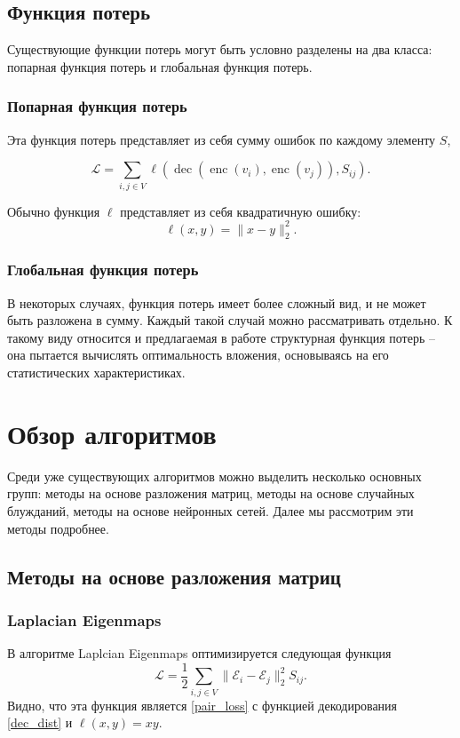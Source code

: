 \documentclass[12pt,a4paper]{extarticle}
\newcommand{\E}{\mathcal{E}}
\newcommand{\Loss}{\mathcal{L}}
\newcommand{\encoder}{\operatorname{enc}}
\newcommand{\decoder}{\operatorname{dec}}
\begin{document}
    \subsection{Функция потерь}
    Существующие функции потерь могут быть условно разделены на два класса: попарная функция потерь и глобальная функция потерь.
    
    \subsubsection{Попарная функция потерь}
    Эта функция потерь представляет из себя сумму ошибок по каждому элементу $S$,
    
    \begin{equation} \label{pair_loss}
        \Loss = \sum_{i, j \in V} \ell (\decoder(\encoder(v_i), \encoder(v_j)), S_{ij}).
    \end{equation}
    
    Обычно функция $\ell$ представляет из себя квадратичную ошибку:
    \begin{equation} \label{pair_loss_dist}
    \ell(x, y) = \lVert x - y \rVert_2^2.
    \end{equation}
    
    \subsubsection{Глобальная функция потерь}
    В некоторых случаях, функция потерь имеет более сложный вид, и не может быть разложена в сумму. Каждый такой случай можно рассматривать отдельно. К такому виду относится и предлагаемая в работе структурная функция потерь -- она пытается вычислять оптимальность вложения, основываясь на его статистических характеристиках.

    \section{Обзор алгоритмов}
    Среди уже существующих алгоритмов можно выделить несколько основных групп: методы на основе разложения матриц, методы на основе случайных блужданий, методы на основе нейронных сетей. Далее мы рассмотрим эти методы подробнее.
    \subsection{Методы на основе разложения матриц}
    \subsubsection{Laplacian Eigenmaps \cite{laplacianeigenmaps}}
    В алгоритме Laplcian Eigenmaps оптимизируется следующая функция
    \begin{equation} \label{lapl_loss}
        \Loss = \frac{1}{2} \sum_{i, j \in V} \lVert \E_i - \E_j \rVert_2 ^ 2 S_{ij}.
    \end{equation}
    Видно, что эта функция является \eqref{pair_loss} с функцией декодирования \eqref{dec_dist} и $\ell(x, y) = xy$.
    
\end{document}
